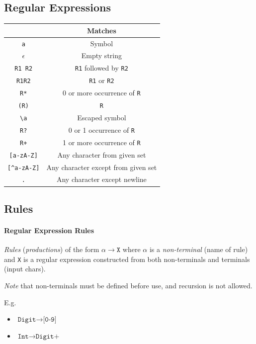 \documentclass[twocolumn,english]{article}
\providecommand{\tabularnewline}{\\}
\providecommand{\tabularnewline}{\\}
\begin{document}
\subsection{Regular Expressions}

\begin{table}[H]
\centering{}%
\begin{tabular}{cc}
\toprule 
 & \textbf{\footnotesize{}Matches}\tabularnewline
\midrule
\texttt{a} & {\footnotesize{}Symbol}\tabularnewline
$\epsilon$ & {\footnotesize{}Empty string}\tabularnewline
\texttt{R1 R2} & \texttt{\footnotesize{}R1}{\footnotesize{} followed by }\texttt{\footnotesize{}R2}\tabularnewline
\texttt{R1\textbar{}R2} & \texttt{\footnotesize{}R1}{\footnotesize{} or }\texttt{\footnotesize{}R2}\tabularnewline
\texttt{R{*}} & {\footnotesize{}0 or more occurrence of }\texttt{\footnotesize{}R}\tabularnewline
\texttt{(R)} & \texttt{\footnotesize{}R}\tabularnewline
\texttt{\textbackslash{}a} & {\footnotesize{}Escaped symbol}\tabularnewline
\midrule
\texttt{R?} & {\footnotesize{}0 or 1 occurrence of }\texttt{\footnotesize{}R}\tabularnewline
\texttt{R+} & {\footnotesize{}1 or more occurrence of }\texttt{\footnotesize{}R}\tabularnewline
\texttt{{[}a-zA-Z{]}} & {\footnotesize{}Any character from given set}\tabularnewline
\texttt{{[}\textasciicircum{}a-zA-Z{]}} & {\footnotesize{}Any character except from given set}\tabularnewline
\texttt{.} & {\footnotesize{}Any character except newline}\tabularnewline
\bottomrule
\end{tabular}
\end{table}


\subsection{Rules}

\paragraph{Regular Expression Rules}

\emph{Rules} (\emph{productions}) of the form $\alpha\rightarrow\texttt{X}$
where $\alpha$ is a \emph{non-terminal} (name of rule) and \texttt{X}
is a regular expression constructed from both non-terminals and terminals
(input chars).

\emph{Note} that non-terminals must be defined before use, and recursion
is not allowed.

E.g.
\begin{itemize}
\item $\texttt{Digit}\rightarrow\texttt{[0-9]}$
\item $\texttt{Int}\rightarrow\texttt{Digit+}$
\end{itemize}
\end{document}
